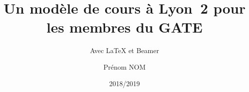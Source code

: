 \title{Un modèle de cours à Lyon~2 pour les membres du GATE}
\subtitle{Avec \LaTeX{} et Beamer}
\author{Prénom NOM}
\date{2018/2019}
